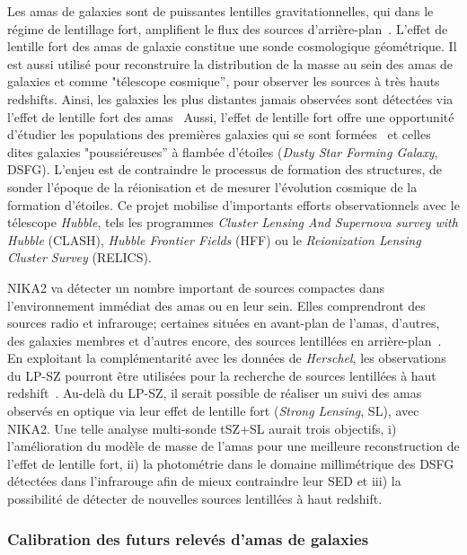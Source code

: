 Les amas de galaxies sont de puissantes lentilles gravitationnelles,
qui dans le régime de lentillage fort, amplifient le flux des sources
d'arrière-plan~\citep[voir \emph{e.g.} pour une
  revue][]{Kneib2011}. L'effet de lentille fort des amas de galaxie
constitue une sonde cosmologique géométrique. Il est aussi utilisé
pour reconstruire la distribution de la masse au sein des amas de
galaxies et comme "télescope cosmique'', pour observer les sources à
très hauts redshifts. Ainsi, les galaxies les plus distantes jamais
observées sont détectées via l'effet de lentille fort des
amas~\citep[voir][par exemple]{Salmon2018} Aussi,
l'effet de lentille fort offre une opportunité d'étudier les
populations des premières galaxies qui se sont
formées~\citep[voir][par exemple]{Oesch2018} et celles dites galaxies
"poussiéreuses'' à flambée d'étoiles (\emph{Dusty Star Forming
  Galaxy}, DSFG). L'enjeu est de contraindre le processus de formation
des structures, de sonder l'époque de la réionisation et de mesurer
l'évolution cosmique de la formation d'étoiles. Ce projet mobilise
d'importants efforts observationnels avec le télescope \emph{Hubble},
tels les programmes \emph{Cluster Lensing And Supernova survey with
  Hubble} (CLASH), \emph{Hubble Frontier Fields} (HFF) ou le
\emph{Reionization Lensing Cluster Survey} (RELICS).

NIKA2 va détecter un nombre important de sources compactes dans
l'environnement immédiat des amas ou en leur sein. Elles comprendront
des sources radio et infrarouge; certaines situées en avant-plan de
l'amas, d'autres, des galaxies membres et d'autres encore, des sources
lentillées en arrière-plan~\citep{Adam2016, Ruppin2018}. En
exploitant la complémentarité avec les données de \emph{Herschel}, les
observations du LP-SZ pourront être utilisées pour la recherche de
sources lentillées à haut redshift~\citep{Adam2015}. Au-delà du LP-SZ,
il serait possible de réaliser un suivi des amas observés en optique
via leur effet de lentille fort (\emph{Strong Lensing}, SL), avec
NIKA2. Une telle analyse multi-sonde tSZ+SL aurait trois objectifs, i)
l'amélioration du modèle de masse de l'amas pour une meilleure
reconstruction de l'effet de lentille fort, ii) la photométrie dans le
domaine millimétrique des DSFG détectées dans l'infrarouge afin de
mieux contraindre leur SED et iii) la possibilité de détecter de
nouvelles sources lentillées à haut redshift.


\subsubsection{Calibration des futurs relevés d'amas de galaxies}

